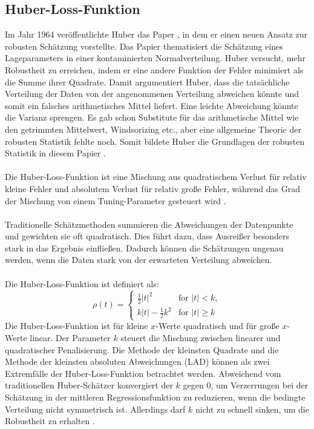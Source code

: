 \subsection{Huber-Loss-Funktion}
\label{huberregression}
Im Jahr 1964 veröffentlichte Huber das Paper , in dem er einen neuen Ansatz zur robusten Schätzung vorstellte. Das Papier thematisiert die Schätzung eines Lageparameters in einer kontaminierten Normalverteilung. Huber versucht, mehr Robustheit zu erreichen, indem er eine andere Funktion der Fehler minimiert als die Summe ihrer Quadrate. Damit argumentiert Huber, dass die tatsächliche Verteilung der Daten von der angenommenen Verteilung abweichen könnte und somit ein falsches arithmetisches Mittel liefert. Eine leichte Abweichung könnte die Varianz sprengen. Es gab schon Substitute für das arithmetische Mittel wie den getrimmten Mittelwert, Windsorizing etc., aber eine allgemeine Theorie der robusten Statistik fehlte noch. Somit bildete Huber die Grundlagen der robusten Statistik in diesem Papier \cite{huberpapier}. \\\\
Die Huber-Loss-Funktion ist eine Mischung aus quadratischem Verlust für relativ kleine Fehler und absolutem Verlust für relativ große Fehler, während das Grad der Mischung von einem Tuning-Parameter gesteuert wird \cite{indirekthuber}. 
\\\\
Traditionelle Schätzmethoden summieren die Abweichungen der Datenpunkte und gewichten sie oft quadratisch. Dies führt dazu, dass Ausreißer besonders stark in das Ergebnis einfließen. Dadurch können die Schätzungen ungenau werden, wenn die Daten stark von der erwarteten Verteilung abweichen.    \\\\
Die Huber-Loss-Funktion ist definiert als:
\begin{equation}
\rho(t) = 
\begin{cases} 
  \frac{1}{2} |t|^2 & \text{for } |t| < k, \\ 
  k |t| - \frac{1}{2} k^2 & \text{for } |t| \geq k 
\end{cases}
\label{eq:huber}
\end{equation}
Die Huber-Loss-Funktion ist für kleine \(x\)-Werte quadratisch und für große \(x\)-Werte linear. Der Parameter \(k\) steuert die Mischung zwischen linearer und quadratischer Penalisierung. Die Methode der kleinsten Quadrate und die Methode der kleinsten absoluten Abweichungen (\ac{LAD}) können als zwei Extremfälle der Huber-Loss-Funktion betrachtet werden. Abweichend vom traditionellen Huber-Schätzer konvergiert der \(k\) gegen 0, um Verzerrungen bei der Schätzung in der mittleren Regressionsfunktion zu reduzieren, wenn die bedingte Verteilung nicht symmetrisch ist. Allerdings darf \(k\) nicht zu schnell sinken, um die Robustheit zu erhalten \cite{indirekthuber}. \\\\
